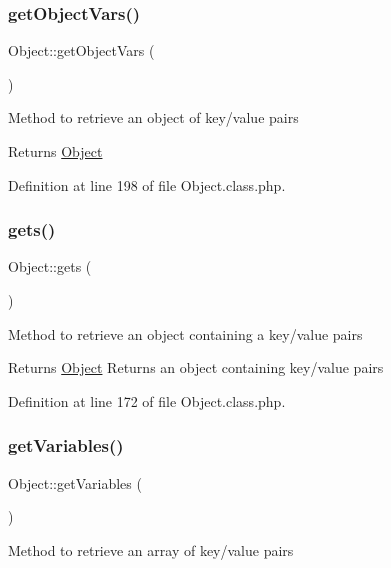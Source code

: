 \subsubsection{\texorpdfstring{get\+Object\+Vars()}{getObjectVars()}}
{\footnotesize\ttfamily Object\+::get\+Object\+Vars (\begin{DoxyParamCaption}{ }\end{DoxyParamCaption})}

Method to retrieve an object of key/value pairs

\begin{DoxyReturn}{Returns}
\hyperlink{classObject}{Object} 
\end{DoxyReturn}


Definition at line 198 of file Object.\+class.\+php.

\hypertarget{classObject_ad6f51071a4048c1fed581748065e4d68}{}\label{classObject_ad6f51071a4048c1fed581748065e4d68} 
\subsubsection{\texorpdfstring{gets()}{gets()}}
{\footnotesize\ttfamily Object\+::gets (\begin{DoxyParamCaption}{ }\end{DoxyParamCaption})}

Method to retrieve an object containing a key/value pairs

\begin{DoxyReturn}{Returns}
\hyperlink{classObject}{Object} Returns an object containing key/value pairs 
\end{DoxyReturn}


Definition at line 172 of file Object.\+class.\+php.

\hypertarget{classObject_ad33c509ec041fb43c6e25f8155577925}{}\label{classObject_ad33c509ec041fb43c6e25f8155577925} 
\subsubsection{\texorpdfstring{get\+Variables()}{getVariables()}}
{\footnotesize\ttfamily Object\+::get\+Variables (\begin{DoxyParamCaption}{ }\end{DoxyParamCaption})}

Method to retrieve an array of key/value pairs

